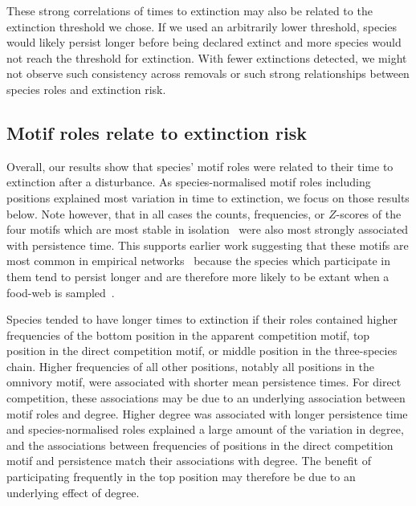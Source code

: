 \documentclass[12pt]{article}
\begin{document}
\begin{spacing}{1.0}
        These strong correlations of times to extinction may also be related to the extinction threshold we chose.
        If we used an arbitrarily lower threshold, species would likely persist longer before being declared extinct and more species would not reach the threshold for extinction.
        With fewer extinctions detected, we might not observe such consistency across removals or such strong relationships between species roles and extinction risk.


	\subsection*{Motif roles relate to extinction risk}

		Overall, our results show that species' motif roles were related to their time to extinction after a disturbance.
        As species-normalised motif roles including positions explained most variation in time to extinction, we focus on those results below. 
        Note however, that in all cases the counts, frequencies, or $Z$-scores of the four motifs which are most stable in isolation~\citep{Borrelli2015a} were also most strongly associated with persistence time.
        This supports earlier work suggesting that these motifs are most common in empirical networks~\citep{Stouffer2007} because the species which participate in them tend to persist longer and are therefore more likely to be extant when a food-web is sampled~\citep{Borrelli2015}.
        

        Species tended to have longer times to extinction if their roles contained higher frequencies of the bottom position in the apparent competition motif, top position in the direct competition motif, or middle position in the three-species chain.
        Higher frequencies of all other positions, notably all positions in the omnivory motif, were associated with shorter mean persistence times.
        For direct competition, these associations may be due to an underlying association between motif roles and degree. 
        Higher degree was associated with longer persistence time and species-normalised roles explained a large amount of the variation in degree, and the associations between frequencies of positions in the direct competition motif and persistence match their associations with degree.
        The benefit of participating frequently in the top position may therefore be due to an underlying effect of degree.  
        

\end{spacing}
\end{document}
